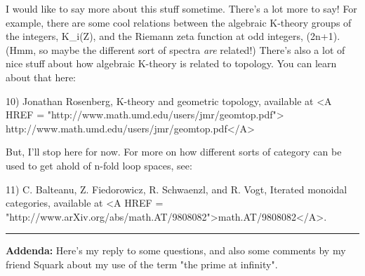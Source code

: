 I would like to say more about this stuff sometime.  There's a lot more 
to say!  For example, there are some cool relations between the algebraic 
K-theory groups of the integers, K_{i}(Z), and 
the Riemann zeta function at odd integers, \zeta (2n+1).
(Hmm, so maybe the different sort of spectra \emph{are} related!)  There's 
also a lot of nice stuff about how algebraic K-theory is related to topology.
You can learn about that here:

10) Jonathan Rosenberg, K-theory and geometric topology, available at
<A HREF = "http://www.math.umd.edu/users/jmr/geomtop.pdf">
http://www.math.umd.edu/users/jmr/geomtop.pdf</A>

But, I'll stop here for now.  For more on how different sorts of category
can be used to get ahold of n-fold loop spaces, see:

11) C. Balteanu, Z. Fiedorowicz, R. Schwaenzl, and R. Vogt, Iterated monoidal 
categories, available at <A HREF = "http://www.arXiv.org/abs/math.AT/9808082">math.AT/9808082</A>.

\par\noindent\rule{\textwidth}{0.4pt}
\textbf{Addenda:} Here's my reply to some questions, and also some comments
by my friend Squark about my use of the term "the prime at infinity".

